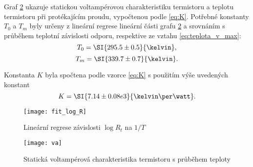\documentclass[0-protokol.tex]{subfiles}
\begin{document}
Graf \ref{fig:va} ukazuje statickou voltampérovou charakteristiku termistoru a teplotu termistoru při protékajícím proudu, vypočtenou podle \eqref{eq:K}. Potřebné konstanty $T_0$ a $T_m$ byly určeny z lineární regrese lineární části grafu \ref{fig:va} a srovnáním s průběhem teplotní závislosti odporu, respektive ze vztahu \eqref{eq:teplota_v_max}:
$$ T_0 = \SI{295.5 \pm 0.5}{\kelvin},$$
$$ T_m = \SI{339.7 \pm 0.7}{\kelvin}. $$

Konstanta $K$ byla spočtena podle vzorce \eqref{eq:K} s použitím výše uvedených konstant
$$ K = \SI{7.14 \pm 0.08 e3}{\kelvin\per\watt}. $$
\begin{figure}[H]
\centering
\texttt{[image: fit\_log\_R]}
\caption{Lineární regrese závislosti $\log R_t$ na $1/T$}
\label{fig:fit_log_R}
\end{figure}

\begin{figure}[H]
\centering
\texttt{[image: va]}
\caption{Statická voltampérová charakteristika termistoru s průběhem teploty}
\label{fig:va}
\end{figure}
\end{document}
